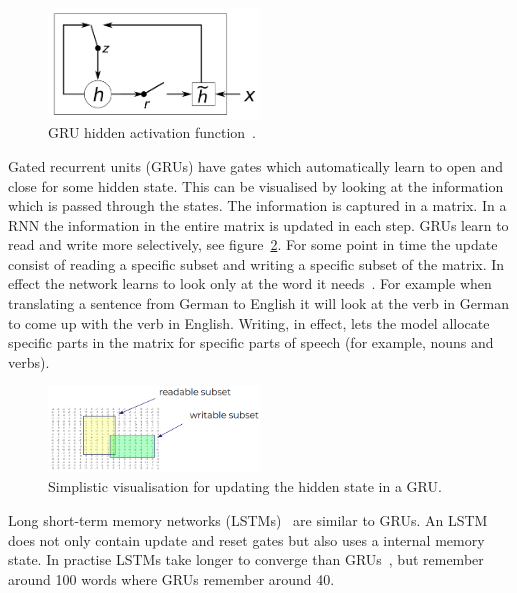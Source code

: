 \begin{figure}[htbp]
    \begin{center}
        \includegraphics[width=0.5\textwidth]{figures/gru.png}
    \end{center}
    \caption{GRU hidden activation function~\cite[Figure 2]{cho2014learning}.}
    \label{fig:gru}
\end{figure}

Gated recurrent units (GRUs) have gates which automatically learn to open and close for some hidden state.
This can be visualised by looking at the information which is passed through the states.
The information is captured in a matrix.
In a RNN the information in the entire matrix is updated in each step.
GRUs learn to read and write more selectively, see figure~\ref{fig:gru_subset}.
For some point in time the update consist of reading a specific subset and writing a specific subset of the matrix.
In effect the network learns to look only at the word it needs~\citep{manning2017lectures}.
For example when translating a sentence from German to English it will look at the verb in German to come up with the verb in English.
Writing, in effect, lets the model allocate specific parts in the matrix for specific parts of speech (for example, nouns and verbs).

\begin{figure}[htbp]
    \begin{center}
        \includegraphics[width=0.5\textwidth]{figures/gru_subset.png}
    \end{center}
    \caption{Simplistic visualisation for updating the hidden state in a GRU.}
    \label{fig:gru_subset}
\end{figure}

Long short-term memory networks (LSTMs)~\citep{hochreiter1997long} are similar to GRUs.
An LSTM does not only contain update and reset gates but also uses a internal memory state.
In practise LSTMs take longer to converge than GRUs~\citep{chung2014empirical}, but remember around 100 words where GRUs remember around 40.

